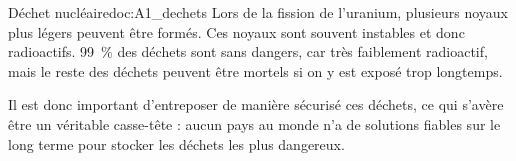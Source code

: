 \begin{doc}{Déchet nucléaire}{doc:A1_dechets}
  Lors de la fission de l'uranium, plusieurs noyaux plus légers peuvent être formés.
  Ces noyaux sont souvent instables et donc radioactifs.
  \qty{99}{\percent} des déchets sont sans dangers, car très faiblement radioactif, mais le reste des déchets peuvent être mortels si on y est exposé trop longtemps.
  
  Il est donc important d'entreposer de manière sécurisé ces déchets, ce qui s'avère être un véritable casse-tête : aucun pays au monde n'a de solutions fiables sur le long terme pour stocker les déchets les plus dangereux.
\end{doc}


